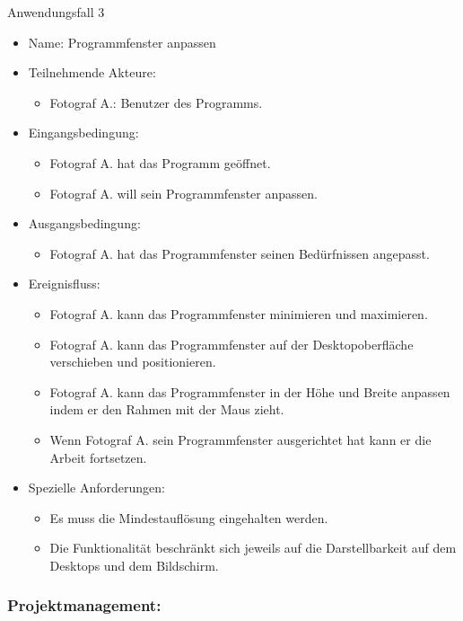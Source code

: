 \begin{description}
	\item[Anwendungsfall 3]
	\end{description}
	
	\begin{itemize}
		\item Name: Programmfenster anpassen
		\item Teilnehmende Akteure:
		\begin{itemize}
			\item	Fotograf A.: Benutzer des Programms.
		\end{itemize}
		\item Eingangsbedingung:
		\begin{itemize}
			\item Fotograf A. hat das Programm geöffnet.
			\item Fotograf A. will sein Programmfenster anpassen.						
		\end{itemize}
		\item Ausgangsbedingung:
		\begin{itemize}
			\item	Fotograf A. hat das Programmfenster seinen Bedürfnissen angepasst.		
		\end{itemize}
		\item Ereignisfluss:	
		\begin{itemize}
			\item Fotograf A. kann das Programmfenster minimieren und maximieren.
			\item Fotograf A. kann das Programmfenster auf der Desktopoberfläche verschieben und positionieren.
			\item Fotograf A. kann das Programmfenster in der Höhe und Breite anpassen indem er den Rahmen mit der Maus zieht.
			\item Wenn Fotograf A. sein Programmfenster ausgerichtet hat kann er die Arbeit fortsetzen.
		\end{itemize}
		\item Spezielle Anforderungen:
		\begin{itemize}
			\item	Es muss die Mindestauflösung eingehalten werden.
			\item Die Funktionalität beschränkt sich jeweils auf die Darstellbarkeit auf dem Desktops und dem Bildschirm.
		\end{itemize}
	\end{itemize}	
	
	\subsubsection{Projektmanagement:}
		
